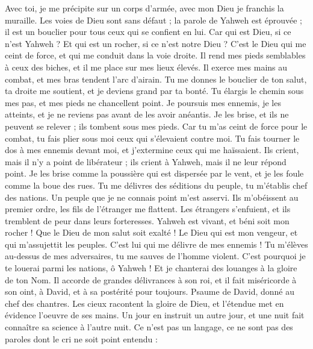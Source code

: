 \begin{multicols}{2}
Avec toi, je me précipite sur un corps d’armée, avec mon Dieu je franchis la muraille.
Les voies de Dieu sont sans défaut ; la parole de Yahweh est éprouvée ; il est un bouclier pour tous ceux qui se confient en lui.
Car qui est Dieu, si ce n’est Yahweh ? Et qui est un rocher, si ce n’est notre Dieu ?
C'est le Dieu qui me ceint de force, et qui me conduit dans la voie droite.
Il rend mes pieds semblables à ceux des biches, et il me place sur mes lieux élevés.
Il exerce mes mains au combat, et mes bras tendent l’arc d’airain.
Tu me donnes le bouclier de ton salut, ta droite me soutient, et je deviens grand par ta bonté.
Tu élargis le chemin sous mes pas, et mes pieds ne chancellent point.
Je poursuis mes ennemis, je les atteints, et je ne reviens pas avant de les avoir anéantis.
Je les brise, et ils ne peuvent se relever ; ils tombent sous mes pieds.
Car tu m'as ceint de force pour le combat, tu fais plier sous moi ceux qui s'élevaient contre moi.
Tu fais tourner le dos à mes ennemis devant moi, et j’extermine ceux qui me haïssaient.
Ils crient, mais il n'y a point de libérateur ; ils crient à Yahweh, mais il ne leur répond point.
Je les brise comme la poussière qui est dispersée par le vent, et je les foule comme la boue des rues.
Tu me délivres des séditions du peuple, tu m'établis chef des nations. Un peuple que je ne connais point m'est asservi.
Ils m’obéissent au premier ordre, les fils de l’étranger me flattent.
Les étrangers s’enfuient, et ils tremblent de peur dans leurs forteresses.
Yahweh est vivant, et béni soit mon rocher ! Que le Dieu de mon salut soit exalté !
Le Dieu qui est mon vengeur, et qui m’assujettit les peuples.
C'est lui qui me délivre de mes ennemis ! Tu m'élèves au-dessus de mes adversaires, tu me sauves de l’homme violent.
C'est pourquoi je te louerai parmi les nations, ô Yahweh ! Et je chanterai des louanges à la gloire de ton Nom.
Il accorde de grandes délivrances à son roi, et il fait miséricorde à son oint, à David, et à sa postérité pour toujours.
\VerseOne{}Psaume de David, donné au chef des chantres.
Les cieux racontent la gloire de Dieu, et l'étendue met en évidence l'oeuvre de ses mains.
Un jour en instruit un autre jour, et une nuit fait connaître sa science à l'autre nuit.
Ce n’est pas un langage, ce ne sont pas des paroles dont le cri ne soit point entendu :

\end{multicols}
